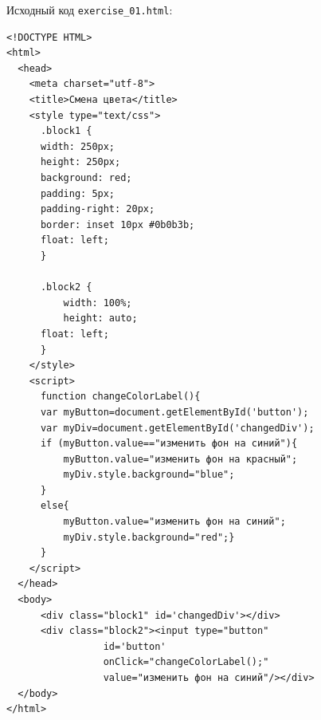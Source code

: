 Исходный код \verb|exercise_01.html|:

\begin{verbatim}
<!DOCTYPE HTML>
<html>
  <head>
    <meta charset="utf-8">
    <title>Смена цвета</title>
    <style type="text/css">
      .block1 {
      width: 250px;
      height: 250px;
      background: red;
      padding: 5px;
      padding-right: 20px;
      border: inset 10px #0b0b3b;
      float: left;
      }
      
      .block2 {
          width: 100%;
          height: auto;
	  float: left;
      }
    </style>
    <script>
      function changeColorLabel(){
	  var myButton=document.getElementById('button');
	  var myDiv=document.getElementById('changedDiv');
	  if (myButton.value=="изменить фон на синий"){
	      myButton.value="изменить фон на красный";
	      myDiv.style.background="blue";
	  }
	  else{
	      myButton.value="изменить фон на синий";
	      myDiv.style.background="red";}
      }
    </script>
  </head>
  <body>
      <div class="block1" id='changedDiv'></div>
      <div class="block2"><input type="button"
				 id='button'
				 onClick="changeColorLabel();"
				 value="изменить фон на синий"/></div>
  </body>
</html>
\end{verbatim}
